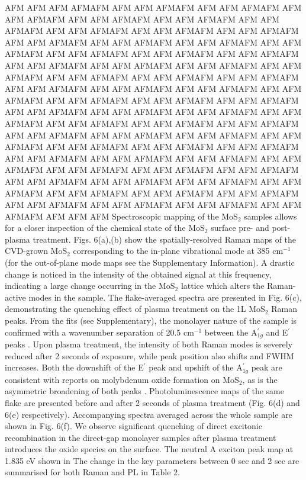 \documentclass[%
 reprint,
superscriptaddress,
 amsmath,amssymb,
 aps,
prb,
]{revtex4-1}
\begin{document}
\indent AFM AFM AFM AFMAFM AFM AFM AFMAFM AFM AFM AFMAFM AFM AFM AFMAFM AFM AFM AFMAFM AFM AFM AFMAFM AFM AFM AFMAFM AFM AFM AFMAFM AFM AFM AFMAFM AFM AFM AFMAFM AFM AFM AFMAFM AFM AFM AFMAFM AFM AFM AFMAFM AFM AFM AFMAFM AFM AFM AFMAFM AFM AFM AFMAFM AFM AFM AFMAFM AFM AFM AFMAFM AFM AFM AFMAFM AFM AFM AFMAFM AFM AFM AFMAFM AFM AFM AFMAFM AFM AFM AFMAFM AFM AFM AFMAFM AFM AFM AFMAFM AFM AFM AFMAFM AFM AFM AFMAFM AFM AFM AFMAFM AFM AFM AFMAFM AFM AFM AFMAFM AFM AFM AFMAFM AFM AFM AFMAFM AFM AFM AFMAFM AFM AFM AFMAFM AFM AFM AFMAFM AFM AFM AFMAFM AFM AFM AFMAFM AFM AFM AFMAFM AFM AFM AFMAFM AFM AFM AFMAFM AFM AFM AFMAFM AFM AFM AFMAFM AFM AFM AFMAFM AFM AFM AFMAFM AFM AFM AFMAFM AFM AFM AFMAFM AFM AFM AFMAFM AFM AFM AFMAFM AFM AFM AFMAFM AFM AFM AFMAFM AFM AFM AFMAFM AFM AFM AFMAFM AFM AFM AFMAFM AFM AFM AFMAFM AFM AFM AFMAFM AFM AFM AFMAFM AFM AFM AFMAFM AFM AFM AFMAFM AFM AFM AFMAFM AFM AFM AFMAFM AFM AFM AFMAFM AFM AFM AFMAFM AFM AFM AFMAFM AFM AFM AFM \newline
\indent Spectroscopic mapping of the MoS$_2$ samples allows for a closer inspection of the chemical state of the MoS$_2$ surface pre- and post-plasma treatment. Figs. 6(a),(b) show the spatially-resolved Raman maps of the CVD-grown MoS$_2$ corresponding to the in-plane vibrational mode at 385 cm$^{-1}$ (for the out-of-plane mode maps see the Supplementary Information). A drastic change is noticed in the intensity of the obtained signal at this frequency, indicating a large change occurring in the MoS$_2$ lattice which alters the Raman-active modes in the sample. The flake-averaged spectra are presented in Fig. 6(c), demonstrating the quenching effect of plasma treatment on the 1L MoS$_2$ Raman peaks. From the fits (see Supplementary), the monolayer nature of the sample is confirmed with a wavenumber separation of 20.5 cm$^{-1}$ between the A$_{1g}^{'}$ and E$^{'}$ peaks \cite{li2012bulk}. Upon plasma treatment, the intensity of both Raman modes is severely reduced after 2 seconds of exposure, while peak position also shifts and FWHM increases. Both the downshift of the E$^{'}$ peak and upshift of the A$^{'}_{1g}$ peak are consistent with reports on molybdenum oxide formation on MoS$_2$, as is the asymmetric broadening of both peaks \cite{choudhary2016two,ko2016stack, jadwiszczak2017oxide}. \newline
\indent Photoluminescence maps of the same flake are presented before and after 2 seconds of plasma treatment (Fig. 6(d) and 6(e) respectively). Accompanying spectra averaged across the whole sample are shown in Fig. 6(f). We observe significant quenching of direct excitonic recombination in the direct-gap monolayer samples after plasma treatment introduces the oxide species on the surface. The neutral A exciton peak map at 1.835 eV shown in   
The change in the key parameters between 0 sec and 2 sec are summarised for both Raman and PL in Table 2. \newline
\end{document}
